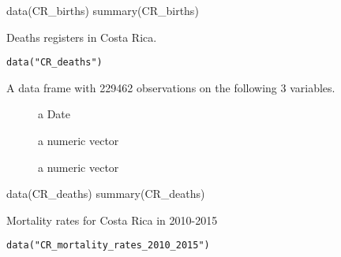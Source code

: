 \documentclass[a4paper]{book}
\begin{document}
%
\begin{Source}\relax
{}
\end{Source}
%
\begin{Examples}
\begin{ExampleCode}
data(CR_births)
summary(CR_births)
\end{ExampleCode}
\end{Examples}
%
\begin{Description}\relax
Deaths registers in Costa Rica.
\end{Description}
%
\begin{Usage}
\begin{verbatim}
data("CR_deaths")
\end{verbatim}
\end{Usage}
%
\begin{Format}
A data frame with 229462 observations on the following 3 variables.
\begin{description}

\item[] a Date
\item[] a numeric vector
\item[] a numeric vector

\end{description}

\end{Format}
%
\begin{Source}\relax
{}
\end{Source}
%
\begin{Examples}
\begin{ExampleCode}
data(CR_deaths)
summary(CR_deaths)
\end{ExampleCode}
\end{Examples}
%
\begin{Description}\relax
Mortality rates for Costa Rica in 2010-2015
\end{Description}
%
\begin{Usage}
\begin{verbatim}
data("CR_mortality_rates_2010_2015")
\end{verbatim}
\end{Usage}
\end{document}
